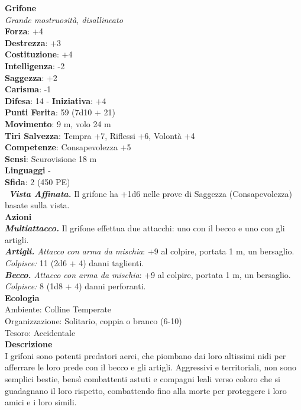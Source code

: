 \begin{multicols}{2}
\medskip\textbf{Grifone}\\
\emph{Grande mostruosità, disallineato}\\
\textbf{Forza}: +4\\
\textbf{Destrezza}: +3\\
\textbf{Costituzione}: +4\\
\textbf{Intelligenza}: -2\\
\textbf{Saggezza}: +2\\
\textbf{Carisma}: -1\\
\textbf{Difesa}: 14 - \textbf{Iniziativa}: +4\\
\textbf{Punti Ferita}: 59 (7d10 + 21)\\
\textbf{Movimento}: 9 m, volo 24 m\\
\textbf{Tiri Salvezza}: Tempra +7, Riflessi +6, Volontà +4\\
\textbf{Competenze}: Consapevolezza +5\\
\textbf{Sensi}: Scurovisione 18 m\\
\textbf{Linguaggi} -\\
\textbf{Sfida}: 2 (450 PE)\smallskip\\\
\emph{\textbf{Vista Affinata.}} Il grifone ha +1d6 nelle prove di Saggezza (Consapevolezza) basate sulla vista.\\
\smallskip\textbf{Azioni}\\
\emph{\textbf{Multiattacco.}} Il grifone effettua due attacchi: uno con il becco e uno con gli artigli.\\
\emph{\textbf{Artigli.} Attacco con arma da mischia}: +9 al colpire, portata 1 m, un bersaglio.\\
\emph{Colpisce:} 11 (2d6 + 4) danni taglienti.\\
\emph{\textbf{Becco.} Attacco con arma da mischia}: +9 al colpire, portata 1 m, un bersaglio.\\
\emph{Colpisce:} 8 (1d8 + 4) danni perforanti.\\
\textbf{Ecologia}\\
Ambiente: Colline Temperate\\
Organizzazione: Solitario, coppia o branco (6-10)\\
Tesoro: Accidentale\\
\textbf{Descrizione}\\
I grifoni sono potenti predatori aerei, che piombano dai loro altissimi nidi per afferrare le loro prede con il becco e gli artigli. Aggressivi e territoriali, non sono semplici bestie, bensì combattenti astuti e compagni leali verso coloro che si guadagnano il loro rispetto, combattendo fino alla morte per proteggere i loro amici e i loro simili.\\


\end{multicols}
